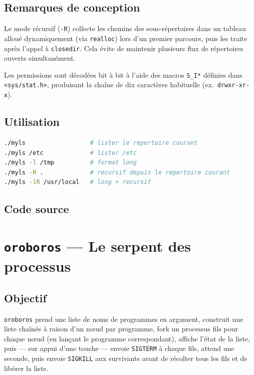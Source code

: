 \documentclass[12pt,a4paper]{article}
\begin{document}
\subsection{Remarques de conception}

Le mode récursif (\texttt{-R}) collecte les chemins des sous-répertoires dans
un tableau alloué dynamiquement (via \texttt{realloc}) lors d'un premier
parcours, puis les traite après l'appel à \texttt{closedir}. Cela évite de
maintenir plusieurs flux de répertoires ouverts simultanément.

Les permissions sont décodées bit à bit à l'aide des macros \texttt{S\_I*}
définies dans \texttt{<sys/stat.h>}, produisant la chaîne de dix caractères
habituelle (ex.\ \texttt{drwxr-xr-x}).

\subsection{Utilisation}

\begin{lstlisting}[language=bash, style=cstyle]
./myls                  # lister le repertoire courant
./myls /etc             # lister /etc
./myls -l /tmp          # format long
./myls -R .             # recursif depuis le repertoire courant
./myls -lR /usr/local   # long + recursif
\end{lstlisting}

\subsection{Code source}



\section{\texttt{oroboros} --- Le serpent des processus}

\subsection{Objectif}

\texttt{oroboros} prend une liste de noms de programmes en argument, construit
une liste chaînée à raison d'un nœud par programme, fork un processus fils
pour chaque nœud (en lançant le programme correspondant), affiche l'état de la
liste, puis --- sur appui d'une touche --- envoie \texttt{SIGTERM} à chaque
fils, attend une seconde, puis envoie \texttt{SIGKILL} aux survivants avant de
récolter tous les fils et de libérer la liste.
\end{document}
